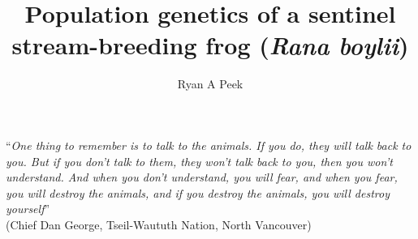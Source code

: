 \documentclass[proquest,12pt,final]{ucthesis-CA2012} %
\begin{document}
\begin{ucfrontmatter}


  \title{Population genetics of a sentinel stream-breeding frog (\emph{Rana
boylii})}
  \author{Ryan A Peek}
   
  \othermemberC{} %
	
	\maketitle
	
	\approvalpage

  \copyrightpage %
  
    \begin{dedication}

      \vspace*{25ex}
      \begin{center}
      \begin{Large}

        ``\emph{One thing to remember is to talk to the animals. If you do, they
        will talk back to you. But if you don't talk to them, they won't talk
        back to you, then you won't understand. And when you don't understand,
        you will fear, and when you fear, you will destroy the animals, and if
        you destroy the animals, you will destroy yourself}''\\
        (Chief Dan George, Tseil-Waututh Nation, North Vancouver)


\end{Large}
\end{center}
\end{dedication}
\end{ucfrontmatter}
\end{document}
